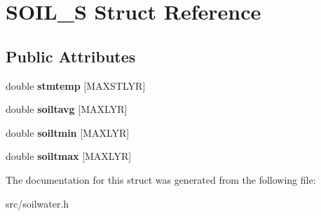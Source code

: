 \hypertarget{struct_s_o_i_l___s}{\section{S\-O\-I\-L\-\_\-\-S Struct Reference}
\label{struct_s_o_i_l___s}
}
\subsection*{Public Attributes}
\begin{DoxyCompactItemize}
\item 
\hypertarget{struct_s_o_i_l___s_a613054bf7ddeaf1781980fdc29ff58de}{double {\bfseries stmtemp} \mbox{[}M\-A\-X\-S\-T\-L\-Y\-R\mbox{]}}\label{struct_s_o_i_l___s_a613054bf7ddeaf1781980fdc29ff58de}

\item 
\hypertarget{struct_s_o_i_l___s_af62629e4d444fa2ae1ea96c018906be5}{double {\bfseries soiltavg} \mbox{[}M\-A\-X\-L\-Y\-R\mbox{]}}\label{struct_s_o_i_l___s_af62629e4d444fa2ae1ea96c018906be5}

\item 
\hypertarget{struct_s_o_i_l___s_ab2518f0f80664d519fa8be571eb14172}{double {\bfseries soiltmin} \mbox{[}M\-A\-X\-L\-Y\-R\mbox{]}}\label{struct_s_o_i_l___s_ab2518f0f80664d519fa8be571eb14172}

\item 
\hypertarget{struct_s_o_i_l___s_ad4b3d8ffa8b6e92fb41a87086a962345}{double {\bfseries soiltmax} \mbox{[}M\-A\-X\-L\-Y\-R\mbox{]}}\label{struct_s_o_i_l___s_ad4b3d8ffa8b6e92fb41a87086a962345}

\end{DoxyCompactItemize}


The documentation for this struct was generated from the following file\-:\begin{DoxyCompactItemize}
\item 
src/soilwater.\-h\end{DoxyCompactItemize}
